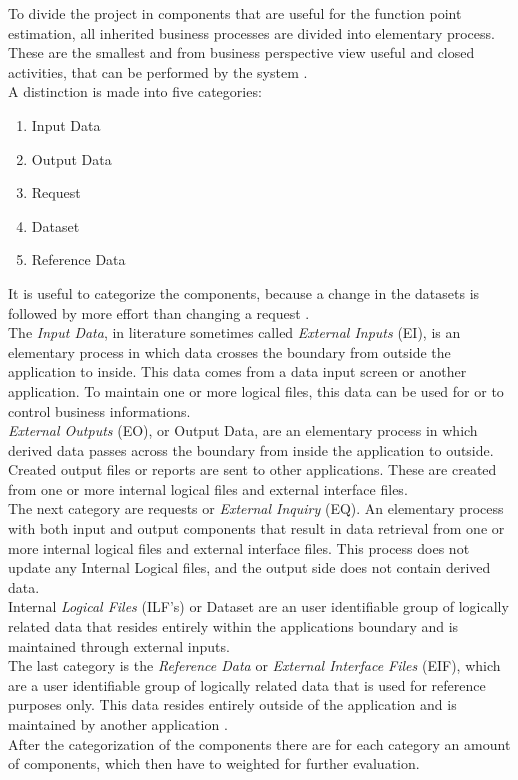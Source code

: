 To divide the project in components that are useful for the function point estimation, all inherited business processes are divided into elementary process. These are the smallest and from business perspective view useful and closed activities, that can be performed by the system \cite{FPKompakt}.\\
A distinction is made into five categories:
\begin{enumerate}
	\item Input Data
	\item Output Data
	\item Request
	\item Dataset
	\item Reference Data
\end{enumerate}
It is useful to categorize the components, because a change in the datasets is followed by more effort than changing a request \cite{itplanung}.\\
The \textit{Input Data}, in literature sometimes called \textit{External Inputs} (EI), is an elementary process in which data crosses the boundary from outside the application to inside. This data comes from a data input screen or another application. To maintain one or more logical files, this data can be used for or to control business informations.\\
\textit{External Outputs} (EO), or Output Data, are an elementary process in which derived data passes across the boundary from inside the application to outside. Created output files or reports are sent to other applications. These are created from one or more internal logical files and external interface files.\\
The next category are requests or \textit{External Inquiry} (EQ). An elementary process with both input and output components that result in data retrieval from one or more internal logical files and external interface files. This process does not update any Internal Logical files, and the output side does not contain derived data.\\
Internal \textit{Logical Files} (ILF’s) or Dataset are an user identifiable group of logically related data that resides entirely within the applications boundary and is maintained through external inputs.\\
The last category is the \textit{Reference Data} or \textit{External Interface Files} (EIF), which are a user identifiable group of logically related data that is used for reference purposes only. This data resides entirely outside of the application and is maintained by another application \cite{fpafundamentals}.\\
After the categorization of the components there are for each category an amount of components, which then have to weighted for further evaluation.

